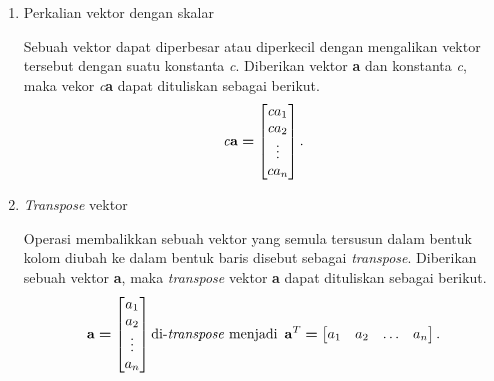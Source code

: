 \begin{enumerate}
$$\begin{bmatrix}
        \end{bmatrix}\text{.}
    $$
    \item Perkalian vektor dengan skalar
    \par Sebuah vektor dapat diperbesar atau diperkecil dengan mengalikan vektor tersebut dengan suatu konstanta \textit{c}. Diberikan vektor \textbf{a} dan konstanta \textit{c}, maka vekor \textit{c}\textbf{a} dapat dituliskan sebagai berikut.
    $$
    \text{\textit{c}\textbf{a}} \bm{=}
    \begin{bmatrix}
        ca_1 \\ca_2 \\\vdots \\ca_n
    \end{bmatrix}\text{.}
    $$
    \item \textit{Transpose} vektor
    \par Operasi membalikkan sebuah vektor yang semula tersusun dalam bentuk kolom diubah ke dalam bentuk baris disebut sebagai \textit{transpose}. Diberikan sebuah vektor \textbf{a}, maka \textit{transpose} vektor \textbf{a} dapat dituliskan sebagai berikut.
    $$
    \text{\textbf{a}} \bm{=}
    \begin{bmatrix}
    a_1 \\a_2 \\ \vdots \\a_n
    \end{bmatrix}
    \text{di-\textit{transpose} menjadi \,}
    \text{\textbf{a}}^T 
    \bm{=} 
    \begin{bmatrix}
    a_1 & a_2 & \ldots & a_n
    \end{bmatrix}\text{.}
    $$
\end{enumerate}
